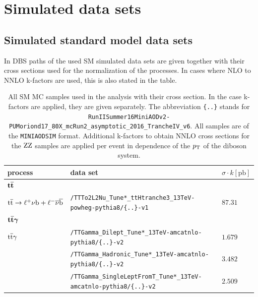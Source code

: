 \chapter{Simulated data sets}
\section*{Simulated standard model data sets}

In  DBS paths of the used SM simulated data sets are given together with their cross sections used for the normalization of the processes. In cases where NLO to NNLO k-factors are used, this is also stated in the table.

\begin{table}[tb]
 \centering
 \caption{All SM MC samples used in the analysis with their cross section. In the case k-factors are applied, they are given separately. The abbreviation \texttt{\{..\}} stands for \texttt{RunIISummer16MiniAODv2-PUMoriond17\_80X\_mcRun2\_asymptotic\_2016\_TrancheIV\_v6}. All samples are of the \texttt{MINIAODSIM} format. Additional k-factors to obtain NNLO cross sections for the $\mathrm{Z}\mathrm{Z}$ samples are applied per event in dependence of the $p_{\mathrm{T}}$ of the diboson system.}
 \scriptsize
 \label{tab:app_MCsets}
 \begin{tabular}[width=\textwidth]{lll}
  \hline
  \normalsize{process}                             & \normalsize{data set}   & \normalsize{$\sigma\cdot k[\mathrm{pb}]$} \\\hline
  $\boldsymbol{{\mathrm{t}\overline{\mathrm{t}}}}$                            &                         &                                           \\
  ${\mathrm{t}\overline{\mathrm{t}}}\to\ell^{+}\nu\mathrm{b}+\ell^{-}\overline{\nu}\overline{\mathrm{b}}$ & \verb|/TTTo2L2Nu_Tune*_ttHtranche3_13TeV-powheg-pythia8/{..}-v1|  & $87.31$                                   \\
  $\boldsymbol{{\mathrm{t}\overline{\mathrm{t}}}\gamma}$                        &                         &                                           \\
  ${\mathrm{t}\overline{\mathrm{t}}}\gamma$                                     & \verb|/TTGamma_Dilept_Tune*_13TeV-amcatnlo-pythia8/{..}-v2| & $1.679$                                   \\
                                                   & \verb|/TTGamma_Hadronic_Tune*_13TeV-amcatnlo-pythia8/{..}-v2| & $3.482$                                   \\
                                                   & \verb|/TTGamma_SingleLeptFromT_Tune*_13TeV-amcatnlo-pythia8/{..}-v2| & $2.509$                                   \\

\end{tabular}
\end{table}
